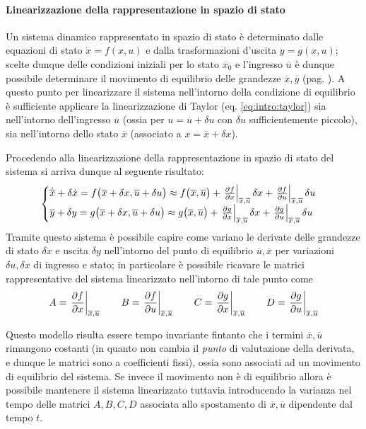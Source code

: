 		\paragraph{Linearizzazione della rappresentazione in spazio di stato} Un sistema dinamico rappresentato in spazio di stato è determinato dalle equazioni di stato $\dot x = f(x,u)$ e dalla trasformazioni d'uscita $y = g(x,u)$; scelte dunque delle condizioni iniziali per lo stato $\overline x_0$ e l'ingresso $\overline u$ è dunque possibile determinare il movimento di equilibrio delle grandezze $\overline x,\overline y$ (pag. \pageref{conc:intro:movequilibrio}). A questo punto per linearizzare il sistema nell'intorno della condizione di equilibrio è sufficiente applicare la linearizzazione di Taylor (eq. \ref{eq:intro:taylor}) sia nell'intorno dell'ingresso $\overline u$ (ossia per $u = \overline u + \delta u$ con $\delta u$ sufficientemente piccolo), sia nell'intorno dello stato $\overline x$ (associato a $x = \overline x + \delta x$).
		
		Procedendo alla linearizzazione della rappresentazione in spazio di stato del sistema si arriva dunque al seguente risultato:
		\[ \begin{cases}
			\dot{\overline x} + \delta \dot x = f\big(\overline x + \delta x,\overline u + \delta u\big) \approx f\big(\overline x,\overline u\big) + \left. \frac{\partial f}{\partial x} \right|_{\overline x,\overline u} \delta x + \left. \frac{\partial f}{\partial u} \right|_{\overline x,\overline u}\delta u \\
			\overline y + \delta y = g\big(\overline x + \delta x,\overline u + \delta u\big) \approx g\big(\overline x,\overline u\big) + \left. \frac{\partial g}{\partial x} \right|_{\overline x,\overline u} \delta x + \left. \frac{\partial g}{\partial u} \right|_{\overline x,\overline u}\delta u \\
		\end{cases} \]
		Tramite questo sistema è possibile capire come variano le derivate delle grandezze di stato $\delta \dot x$ e uscita $\delta y$ nell'intorno del punto di equilibrio $\overline u, \overline x$ per variazioni $\delta u,\delta x$ di ingresso e stato; in particolare è possibile ricavare le matrici rappresentative del sistema linearizzato nell'intorno di tale punto come
		\begin{equation}
			A = \left. \frac{\partial f}{\partial x} \right|_{\overline x,\overline u} \qquad B = \left. \frac{\partial f}{\partial u} \right|_{\overline x,\overline u} \qquad C = \left. \frac{\partial g}{\partial x} \right|_{\overline x,\overline u} \qquad D = \left. \frac{\partial g}{\partial u} \right|_{\overline x,\overline u}
		\end{equation}
		
		Questo modello risulta essere tempo invariante fintanto che i termini $\overline x,\overline u$ rimangono costanti (in quanto non cambia il \textit{punto} di valutazione della derivata, e dunque le matrici sono a coefficienti fissi), ossia sono associati ad un movimento di equilibrio del sistema. Se invece il movimento non è di equilibrio allora è possibile mantenere il sistema linearizzato tuttavia introducendo la varianza nel tempo delle matrici $A,B,C,D$ associata allo spostamento di $\overline x,\overline u$ dipendente dal tempo $t$.
	